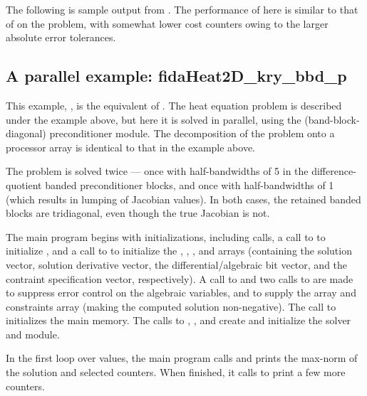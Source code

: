 The following is sample output from .
The performance of {\fida} here is similar to that of {\ida} on
the  problem, with somewhat lower cost counters owing to
the larger absolute error tolerances.



\subsection{A parallel example: fidaHeat2D\_kry\_bbd\_p}\label{ss:fidaHeat2D_bbd_p}

This example, , is the {\F} equivalent of
.  The heat equation problem is described
under the  example above, but here it is solved in
parallel, using the {\idabbdpre} (band-block-diagonal) preconditioner
module.  The decomposition of the problem onto a processor array is
identical to that in the  example above.

The problem is solved twice --- once with half-bandwidths of 5 in the
difference-quotient banded preconditioner blocks, and once with
half-bandwidths of 1 (which results in lumping of Jacobian values).
In both cases, the retained banded blocks are tridiagonal, even though
the true Jacobian is not.

The main program begins with initializations, including {\mpi} calls,
a call to  to initialize {\nvecp}, and a call to
 to initialize the , , , and
 arrays (containing the solution vector, solution derivative vector,
the differential/algebraic bit vector, and the contraint specification
vector, respectively).  A call to  and two calls to
 are made to suppress error control on the algebraic
variables, and to supply the  array and constraints array (making
the computed solution non-negative).  The call to 
initializes the {\fida} main memory.  The calls to
, ,  and
 create and initialize the {\spgmr} solver and {\fidabbd} module.

In the first loop over  values, the main program calls 
and prints the max-norm of the solution and selected counters.  When finished,
it calls  to print a few more counters.

